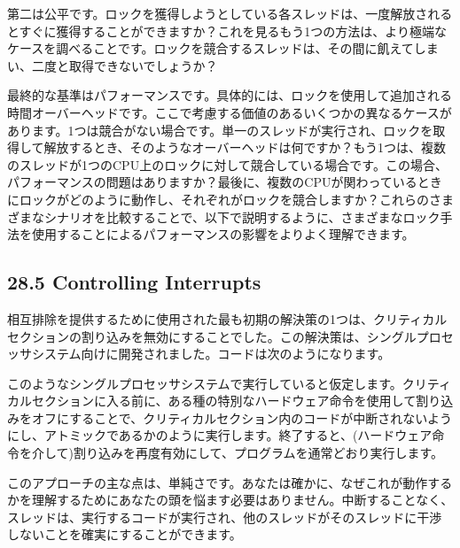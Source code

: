 第二は公平です。ロックを獲得しようとしている各スレッドは、一度解放されるとすぐに獲得することができますか？これを見るもう1つの方法は、より極端なケースを調べることです。ロックを競合するスレッドは、その間に飢えてしまい、二度と取得できないでしょうか？

最終的な基準はパフォーマンスです。具体的には、ロックを使用して追加される時間オーバーヘッドです。ここで考慮する価値のあるいくつかの異なるケースがあります。1つは競合がない場合です。単一のスレッドが実行され、ロックを取得して解放するとき、そのようなオーバーヘッドは何ですか？もう1つは、複数のスレッドが1つのCPU上のロックに対して競合している場合です。この場合、パフォーマンスの問題はありますか？最後に、複数のCPUが関わっているときにロックがどのように動作し、それぞれがロックを競合しますか？これらのさまざまなシナリオを比較することで、以下で説明するように、さまざまなロック手法を使用することによるパフォーマンスの影響をよりよく理解できます。

\hypertarget{controlling-interrupts}{%
\subsection*{28.5 Controlling Interrupts}\label{controlling-interrupts}}

相互排除を提供するために使用された最も初期の解決策の1つは、クリティカルセクションの割り込みを無効にすることでした。この解決策は、シングルプロセッサシステム向けに開発されました。コードは次のようになります。

\begin{Shaded}
\begin{Highlighting}[]
 
\NormalTok{ \}}
 
\NormalTok{ \}}
\end{Highlighting}
\end{Shaded}

このようなシングルプロセッサシステムで実行していると仮定します。クリティカルセクションに入る前に、ある種の特別なハードウェア命令を使用して割り込みをオフにすることで、クリティカルセクション内のコードが中断されないようにし、アトミックであるかのように実行します。終了すると、(ハードウェア命令を介して)割り込みを再度有効にして、プログラムを通常どおり実行します。

このアプローチの主な点は、単純さです。あなたは確かに、なぜこれが動作するかを理解するためにあなたの頭を悩ます必要はありません。中断することなく、スレッドは、実行するコードが実行され、他のスレッドがそのスレッドに干渉しないことを確実にすることができます。

